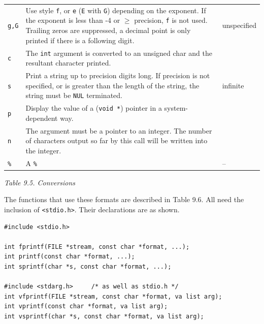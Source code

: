 \begin{tabular}{llp{\textwidth}}
     \texttt{g,G} & Use style \texttt{f}, or \texttt{e} (\texttt{E} with
      \texttt{G}) depending on the exponent.  If the exponent is less
      than -4 or $\geq$ precision, \texttt{f} is not
      used.  Trailing zeros are suppressed, a decimal point is only
      printed if there is a following digit. & unspecified
    \\

     \texttt{c} & The \texttt{int} argument is converted
              to an unsigned char and the
              resultant character printed. & 
    \\

     \texttt{s} & Print a string up to precision digits long. If
      precision is not specified, or is greater than the
      length of the string, the string must be \texttt{NUL}
      terminated. & infinite
    \\

    \texttt{p} & Display the value of a (\texttt{void *}) pointer in a
      system-dependent way. & 
    \\

     \texttt{n} & The argument must be a pointer to an integer.  The number of
      characters output so far by this call will be written into
      the integer. & 
    \\

     \texttt{\%} & A \texttt{\%} & --
    \\
\end{tabular}

\begin{center}\textit{Table 9.5. Conversions}\end{center}


   The functions that use these formats are described in
    Table 9.6.  All need the inclusion of
    \texttt{<stdio.h>}.  Their declarations are as shown.


   \begin{Verbatim}
#include <stdio.h>

int fprintf(FILE *stream, const char *format, ...);
int printf(const char *format, ...);
int sprintf(char *s, const char *format, ...);

#include <stdarg.h>     /* as well as stdio.h */
int vfprintf(FILE *stream, const char *format, va list arg);
int vprintf(const char *format, va list arg);
int vsprintf(char *s, const char *format, va list arg);
\end{Verbatim}

